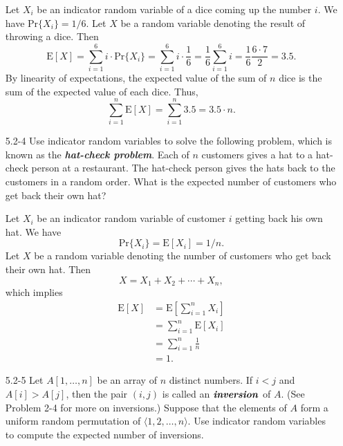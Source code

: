 \begin{enumerate}
\begin{framed}
Let $X_i$ be an indicator random variable of a dice coming up the number $i$. We
have $\text{Pr}\{X_i\} = 1/6$. Let $X$ be a random variable denoting the
result of throwing a dice. Then
\[
  \text{E}[X] = \sum_{i = 1}^{6} i \cdot \text{Pr}\{X_i\}
              = \sum_{i = 1}^{6} i \cdot \frac{1}{6}
              = \frac{1}{6} \sum_{i = 1}^{6} i
              = \frac{1}{6} \frac{6 \cdot 7}{2} = 3.5.
\]
By linearity of expectations, the expected value of the sum of $n$ dice is the
sum of the expected value of each dice. Thus,
\[
  \sum_{i = 1}^{n} \text{E}[X] = \sum_{i = 1}^{n} 3.5 = 3.5 \cdot n.
\]
\end{framed}

\item[5.2{-}4]{Use indicator random variables to solve the following problem,
which is known as the \textbf{\emph{hat-check problem}}. Each of $n$ customers
gives a hat to a hat-check person at a restaurant. The hat-check person
gives the hats back to the customers in a random order. What is the expected
number of customers who get back their own hat?}

\begin{framed}
Let $X_i$ be an indicator random variable of customer $i$ getting back his own
hat. We have
\[
\text{Pr}\{X_i\} = \text{E}[X_i] = 1/n.
\]
Let $X$ be a random variable denoting the number of customers who get back their
own hat. Then
\[
  X = X_1 + X_2 + \cdots + X_n,
\]
which implies
\begin{equation*}
\begin{aligned}
  \text{E}[X] &= \text{E}\left[\sum_{i = 1}^{n} X_i\right]\\
              &= \sum_{i = 1}^{n} \text{E}[X_i]\\
              &= \sum_{i = 1}^{n} \frac{1}{n}\\
              &= 1.
\end{aligned}
\end{equation*}
\end{framed}

\item[5.2{-}5]{Let $A[1, \dots, n]$ be an array of $n$ distinct numbers. If
$i < j$ and $A[i] > A[j]$, then the pair $(i, j)$ is called an
$\textbf{\emph{inversion}}$ of $A$. (See Problem 2-4 for more on inversions.)
Suppose that the elements of $A$ form a uniform random permutation of
$\langle 1, 2, \dots, n \rangle$. Use indicator random variables to compute
the expected number of inversions.}


\end{enumerate}
